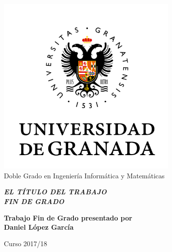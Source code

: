 
\thispagestyle{empty}


\begin{center}

\includegraphics[width=9cm]{simbolo_color.png}\\[2cm]
{\Large\sffamily Doble Grado en Ingeniería Informática y Matemáticas}\\[3mm]


\vspace{2cm}


\begin{Large}
{\slshape\bfseries  EL T\'ITULO DEL TRABAJO\\[6mm]
FIN DE GRADO}
\end{Large}

\vspace{2cm}

\vfill

\begin{large}
{\bf Trabajo Fin de Grado presentado por \\[3mm]
Daniel López García}
\end{large}


\vspace{1.5cm}

\begin{Large}
Curso 2017/18
\end{Large}
\end{center}





